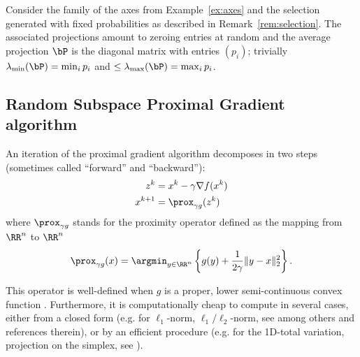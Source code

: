 {
\begin{example}\label{ex:P}
Consider the family of the axes from Example~\ref{ex:axes} and the selection generated with fixed probabilities as described in Remark~\ref{rem:selection}. The associated projections amount to zeroing entries at random and the average projection $\bP$ is the diagonal matrix with entries $(p_i)$; trivially $\lambda_{\min}(\bP)= \min_i p_i$ and $\leq \lambda_{\max}(\bP) = \max_i p_i$.
\end{example}}

\subsection{Random Subspace Proximal Gradient algorithm} \label{sec:algo}

An iteration of the proximal gradient algorithm 
decomposes in two steps (sometimes called ``forward'' and  ``backward''):
\begin{subequations}\label{eq:pgGradProx}
    \begin{align}
    \label{eq:pgGrad} z^k &= x^{k} - \gamma \nabla f(x^k)\\
        \label{eq:pgProx} x^{k+1} &= \prox_{\gamma g}(z^k)
\end{align}
\end{subequations}
where $\prox_{\gamma g}$ stands for the proximity operator defined as the mapping 
from $\RR^n$ to $\RR^n$
\begin{equation}
    \prox_{\gamma g}(x) = \argmin_{y\in\RR^n}\left\{g(y) + \frac{1}{2\gamma} \|y-x\|_2^2\right\} .
\end{equation}

This operator is well-defined when $g$ is a proper, lower semi-continuous convex function \cite[Def.~12.23]{bauschke2011convex}. Furthermore, it is computationally cheap to compute in several cases, either from a closed form ({e.g.} for $\ell_1$-norm, $\ell_1/\ell_2$-norm, see among others \cite{combettes2007proximal} and references therein), or by an efficient procedure ({e.g.} for the 1D-total variation, projection on the simplex, see \cite{yuan2011efficient,condat2013direct}).


